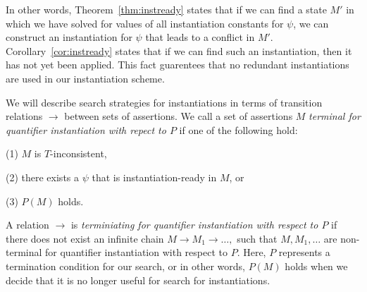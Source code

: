 \documentclass{llncs}
\begin{document}
In other words, Theorem~\ref{thm:instready} states that if we can find a state $M'$ in which we have solved for values of all instantiation constants for $\psi$, we can construct an instantiation for $\psi$ that leads to a conflict in $M'$.
Corollary~\ref{cor:instready} states that if we can find such an instantiation, then it has not yet been applied.
This fact guarentees that no redundant instantiations are used in our instantiation scheme.

\begin{comment}
Now, let us focus on identifying states in which there does not exist any useful instantiations with regards to assumptions about our counterexample.
The basic idea is to find a literal $\l \mapsto^I \psi$ in $M$ such that $\forall \bar{x}. \neg l[\bar{x}/\bar{e}]$ is satisifiable in $M$.
We call such a literal to be $\emph{compatible}$ in $M$.
For example, a EUF literal $f( t_1, \ldots, t_n ) = s$ is compatible if for all terms of the form $f( s_1, \ldots, s_n )$, we have that $t_1 \neq s_1, \ldots t_n \neq s_n$.
That is, the domain of $f( t_1, \ldots, t_n )$ is disjoint from all other terms with top symbol $f$.

Given a theory $T$, we will define search method that will drive the DPLL(T) search with splitting lemmas of the form $( l \vee \neg l )$.
The idea is to chose such lemmas such that the DPLL(T) search will either reach a state $M \parallel F$ such that $\psi$ is instantiation-ready in $M$, or there exists some literal $l \mapsto^I \psi$ that is compatible in $M$.
\end{comment}

We will describe search strategies for instantiations in terms of transition relations $\rightarrow$ between sets of assertions.
We call a set of assertions $M$ \emph{terminal for quantifier instantiation with repect to $P$} if one of the following hold:

(1) $M$ is $T$-inconsistent,

(2) there exists a $\psi$ that is instantiation-ready in $M$, or

(3) $P(M)$ holds.

A relation $\rightarrow$ is \emph{terminiating for quantifier instantiation with respect to $P$} if there does not exist an infinite chain $M \rightarrow M_1 \rightarrow \ldots,$ such that $M, M_1, \ldots$ are non-terminal for quantifier instantiation with respect to $P$.
Here, $P$ represents a termination condition for our search, or in other words, $P(M)$ holds when we decide that it is no longer useful for search for instantiations.
\end{document}
